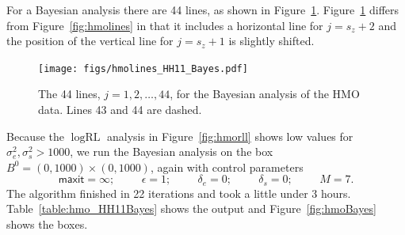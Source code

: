 \documentclass{report}
\newcommand{\textcompute}{\textsf}
\newcommand{\RLorig}{\text{RL}}
\newcommand{\logRLorig}{\log\RLorig}
\newcommand{\sigssq}{\sigma_s^2}
\newcommand{\sigesq}{\sigma_e^2}
\newcommand{\maxit}{\textcompute{maxit}}
\begin{document}
For a Bayesian analysis there are 44 lines, as shown in Figure~\ref{fig:hmoBayeslines}.  Figure~\ref{fig:hmoBayeslines} differs from Figure~\ref{fig:hmolines} in that it includes a horizontal line for $j = s_z+2$ and the position of the vertical line for $j = s_z+1$ is slightly shifted.
\begin{figure}
	\centering
	\texttt{[image: figs/hmolines\_HH11\_Bayes.pdf]}
	\caption{The 44 lines, $j=1, 2, \dots, 44$, for the Bayesian analysis of the HMO data.
	              Lines 43 and 44 are dashed.}
	\label{fig:hmoBayeslines}
\end{figure}
Because the $\logRLorig$ analysis in Figure~\ref{fig:hmorll} shows low values for $\sigesq, \sigssq > 1000$, we run the Bayesian analysis on the box $B^0 = (0,1000) \times (0,1000)$, again with control parameters
\begin{equation*}
	\maxit=\infty; \hspace{1cm} \epsilon=1; \hspace{1cm}
	\delta_e=0; \hspace{1cm} \delta_s=0; \hspace{1cm} M=7.
\end{equation*}
The algorithm finished in 22 iterations and took a little under 3 hours.  Table~\ref{table:hmo_HH11Bayes} shows the output and Figure~\ref{fig:hmoBayes} shows the boxes.
\end{document}
